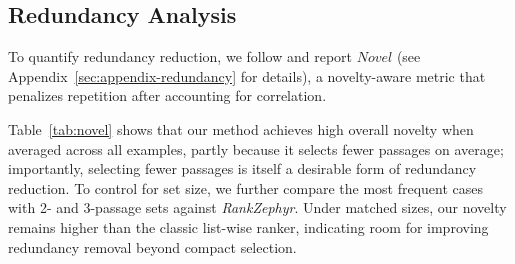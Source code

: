 \documentclass[11pt]{article}
\begin{document}




\subsection{Redundancy Analysis}
To quantify redundancy reduction, we follow \citet{clarke2008novelty,tsai2010evaluation} and report $Novel$ (see Appendix~\ref{sec:appendix-redundancy} for details), a novelty-aware metric that penalizes repetition after accounting for correlation.

Table~\ref{tab:novel} shows that our method achieves high overall novelty when averaged across all examples, partly because it selects fewer passages on average; importantly, selecting fewer passages is itself a desirable form of redundancy reduction.
To control for set size, we further compare the most frequent cases with 2- and 3-passage sets against \textit{RankZephyr}.
Under matched sizes, our novelty remains higher than the classic list-wise ranker, indicating room for improving redundancy removal beyond compact selection.
\end{document}
